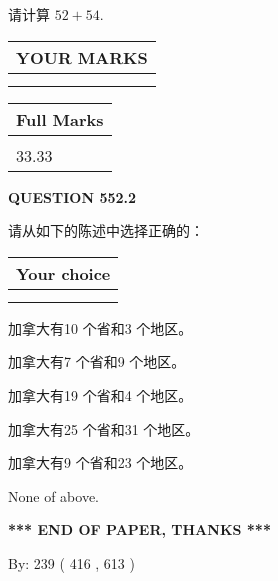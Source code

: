 \documentclass{ctexart}
\begin{document}
  
 
请计算 $ %
52 +  %
54 $.
 

 

 
  
\vspace{0.2in}
  
\noindent\begin{tabular}{|l|}
\hline
 YOUR MARKS  \\
\hline
 \\ 
 \\ 
\hline
\end{tabular}
\hspace{0.05in} \begin{tabular}{|l|}
\hline
 Full Marks  \\
\hline
 \\ 
33.33 \\
\hline
\end{tabular}
{\textbf{\Large{QUESTION
552.2 
}}}
  
  
请从如下的陈述中选择正确的：
  
  
\noindent\hspace{3.0in} \begin{tabular}{|l|}
\hline
Your choice \\
\hline
 \\ 
 \\ 
\hline
\end{tabular}
  
  
 
 
加拿大有10 个省和3 个地区。
 
 
加拿大有7 个省和9 个地区。
 
 
加拿大有19 个省和4 个地区。
 
 
加拿大有25 个省和31 个地区。
 
 
加拿大有9 个省和23 个地区。
 
 
 None of above.
 
 
   
   
 \vspace{0.2in}
 
   
   
   
   
\vspace{1.0in} 
{\textbf{\large{ *** END OF PAPER, THANKS *** }}} 
   
   
\hspace{1.0in} By: 
 239 ( 416 ,  613 )
   
\end{document}
